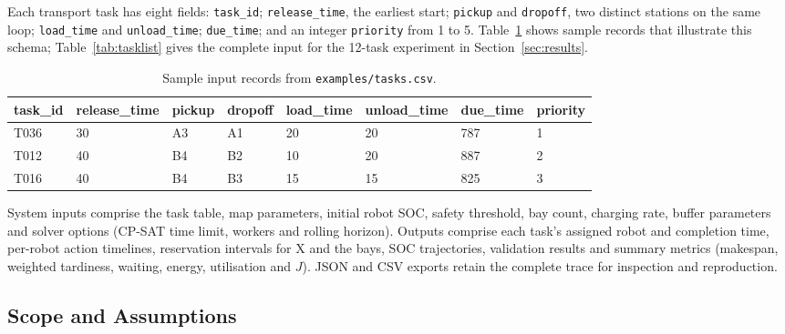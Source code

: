 \documentclass[11pt,a4paper]{article}
\newcommand{\code}[1]{\texttt{#1}}
\begin{document}
Each transport task has eight fields: \code{task\_id}; \code{release\_time}, the earliest start;
\code{pickup} and \code{dropoff}, two distinct stations on the same loop; \code{load\_time} and
\code{unload\_time}; \code{due\_time}; and an integer \code{priority} from 1 to 5.
Table~\ref{tab:sample} shows sample records that illustrate this schema; Table~\ref{tab:tasklist} gives
the complete input for the 12-task experiment in Section~\ref{sec:results}.

\begin{table}[!htbp]
\centering\small
\caption{Sample input records from \code{examples/tasks.csv}.}
\label{tab:sample}
\begin{tabular}{llllllll}
\toprule
task\_id & release\_time & pickup & dropoff & load\_time & unload\_time & due\_time & priority \\
\midrule
T036 & 30 & A3 & A1 & 20 & 20 & 787 & 1 \\
T012 & 40 & B4 & B2 & 10 & 20 & 887 & 2 \\
T016 & 40 & B4 & B3 & 15 & 15 & 825 & 3 \\
\bottomrule
\end{tabular}
\end{table}

System inputs comprise the task table, map parameters, initial robot SOC, safety threshold, bay count,
charging rate, buffer parameters and solver options (CP-SAT time limit, workers and rolling horizon).
Outputs comprise each task's assigned robot and completion time, per-robot action timelines,
reservation intervals for X and the bays, SOC trajectories, validation results and summary metrics
(makespan, weighted tardiness, waiting, energy, utilisation and $J$). JSON and CSV exports retain the
complete trace for inspection and reproduction.

\subsection{Scope and Assumptions}
\label{sec:scope}
\end{document}
